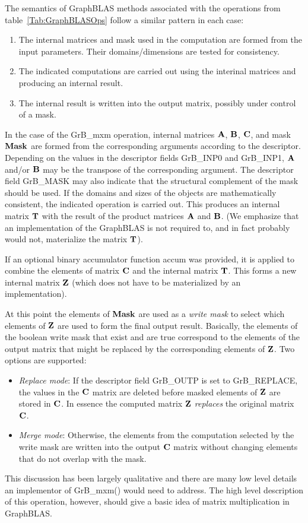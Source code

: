 The semantics of GraphBLAS methods associated with the operations from table~\ref{Tab:GraphBLASOps} follow a similar pattern
in each case:
\begin{enumerate}
\item The internal matrices and mask used in the computation are formed from the input parameters.  Their domains/dimensions are tested for consistency.
\item The indicated computations are carried out using the interinal matrices and producing an internal result.
\item The internal result is written into the output matrix, possibly under control of a mask.
\end{enumerate}
In the case of the {\sf GrB\_mxm} operation, internal matrices ${\bf A}$, ${\bf B}$, ${\bf C}$, and mask ${\bf Mask}$ are formed from
the corresponding arguments according to the descriptor.  Depending on
the values in the descriptor fields {\sf GrB\_INP0} and {\sf GrB\_INP1},  ${\bf A}$ and/or ${\bf B}$ may be the transpose of the corresponding argument.
The descriptor field {\sf GrB\_MASK} may also indicate that the structural complement of the mask 
should be used.  If the domains and sizes of the objects are mathematically consistent, the indicated operation is carried out.
This produces an internal matrix ${\bf T}$ with the result of the product matrices ${\bf A}$ and ${\bf B}$.
(We emphasize that an implementation
of the GraphBLAS is not required to, and in fact probably would not, materialize the matrix ${\bf T}$).

If an optional binary accumulator function {\sf accum} was provided, it is applied to combine the elements of 
matrix ${\bf C}$ and the internal matrix ${\bf T}$.  This forms a new internal matrix ${\bf Z}$ (which does not have to be materialized by an implementation). 

At this point the elements of ${\bf Mask}$ are used as a \emph{write mask} to select which elements of ${\bf Z}$ are 
used to form the final output result.  Basically, the elements of the boolean write mask that exist and are true 
correspond to the elements of the output matrix that might be replaced by the corresponding elements of ${\bf Z}$.
Two options are supported: 
\begin{itemize}
	\item \emph{Replace mode}: If the descriptor field {\sf GrB\_OUTP} is set to {\sf GrB\_REPLACE}, the 
		values in the ${\bf C}$ matrix are deleted before masked elements of ${\bf Z}$ are stored 
		in ${\bf C}$.  In essence the computed matrix ${\bf Z}$ \emph{replaces} the original matrix ${\bf C}$.
	\item \emph{Merge mode}: Otherwise, the elements from the computation selected by the 
		write mask are written into the output ${\bf C}$ matrix without changing elements
		that do not overlap with the mask.
\end{itemize}
This discussion has been largely qualitative and there are many low level details an implementor
of {\sf GrB\_mxm()} would need to address.  The high level description of this operation, however, should
give a basic idea of matrix multiplication in GraphBLAS.

